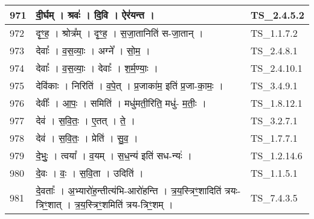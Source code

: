 \documentclass[17pt]{extarticle}
\begin{document}
\begin{longtable}{||p{0.4in}||p{4.9in}||p{0.9in}||}
    971 & दी॒र्घम्   ।   श्रवः॑   ।   दि॒वि   ।   ऐर॑यन्त   ।    & TS\_2.4.5.2       \\
    
    \hline
        
    972 & दृꣳ॒॒ह॒   ।   श्रोत्र᳚म्   ।   दृꣳ॒॒ह॒   ।   स॒जा॒तानिति॑ स{-}जा॒तान्   ।    & TS\_1.1.7.2       \\
    
    \hline
        
    973 & देवाः᳚   ।   व॒स॒व्याः॒   ।   अग्ने᳚   ।   सो॒म॒   ।    & TS\_2.4.8.1       \\
    
    \hline
        
    974 & देवाः᳚   ।   व॒स॒व्याः॒   ।   देवाः᳚   ।   श॒र्म॒ण्याः॒   ।    & TS\_2.4.10.1       \\
    
    \hline
        
    975 & देवि॑काः   ।   निरिति॑   ।   व॒पे॒त्   ।   प्र॒जाका॑म॒ इति॑ प्र॒जा{-}का॒मः॒   ।    & TS\_3.4.9.1       \\
    
    \hline
        
    976 & देवीः᳚   ।   आ॒पः॒   ।   समिति॑   ।   मधु॑मती॒रिति॒ मधु॑{-} म॒तीः॒   ।    & TS\_1.8.12.1       \\
    
    \hline
        
    977 & देव॑   ।   स॒वि॒तः॒   ।   ए॒तत्   ।   ते॒   ।    & TS\_3.2.7.1       \\
    
    \hline
        
    978 & देव॑   ।   स॒वि॒तः॒   ।   प्रेति॑   ।   सु॒व॒   ।    & TS\_1.7.7.1       \\
    
    \hline
        
    979 & दे॒भुः॒   ।   त्वया᳚   ।   व॒यम्   ।   स॒ध॒न्य॑ इति॑ सध{-}न्यः॑   ।    & TS\_1.2.14.6       \\
    
    \hline
        
    980 & दे॒वः   ।   वः॒   ।   स॒वि॒ता   ।   उदिति॑   ।    & TS\_1.1.5.1       \\
    
    \hline
        
    981 & दे॒वताः᳚   ।   अ॒भ्यारो॑ह॒न्तीत्य॑भि{-}आरो॑हन्ति   ।   त्र॒य॒स्त्रिꣳ॒॒शादिति॑ त्रयः{-}त्रिꣳ॒॒शात्   ।   त्र॒य॒स्त्रिꣳ॒॒शमिति॑ त्रय{-}त्रिꣳ॒॒शम्   ।    & TS\_7.4.3.5       \\
    

\end{longtable}
\end{document}
